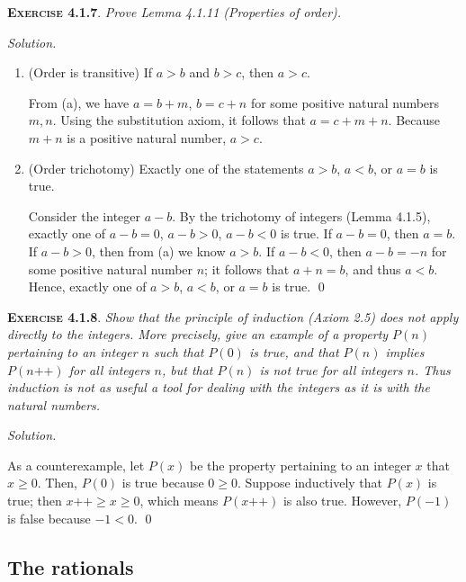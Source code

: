 \documentclass[12pt]{article}
\newcommand{\succr}[1]{#1 \textrm{++}}
\theoremstyle{remark}
\newenvironment{exer}[2]{
    \noindent \setlength{\parskip}{1em}%
    \textsc{\textbf{Exercise #1}}. \textit{#2} \par
    \noindent \textit{Solution.} %
}{\bigskip}
\begin{document}
\begin{exer}{4.1.7}{
    Prove Lemma 4.1.11 (Properties of order).
}
\begin{enumerate}[topsep=0mm,label=(\alph*)]
            To show $-a < -b$, we need to show $(-b) - (-a) > 0$.
            The left-hand side simplifies to $(-b) - (-a) = -b + a = a - b$.
            However, from (a), if $a > b$, then $a - b$ is positive.
            
        \item (Order is transitive) If $a > b$ and $b > c$, then $a > c$.

            From (a), we have $a = b + m$, $b = c + n$ for some positive natural numbers $m, n$.
            Using the substitution axiom, it follows that $a = c + m + n$.
            Because $m + n$ is a positive natural number, $a > c$.
            
        \item (Order trichotomy) Exactly one of the statements $a > b$, $a < b$, or $a = b$ is true.

            Consider the integer $a - b$.
            By the trichotomy of integers (Lemma 4.1.5), exactly one of $a - b = 0$, $a - b > 0$, $a - b < 0$ is true.
            If $a - b = 0$, then $a = b$.
            If $a - b > 0$, then from (a) we know $a > b$.
            If $a - b < 0$, then $a - b = -n$ for some positive natural number $n$; it follows that $a + n = b$, and thus $a < b$.
            Hence, exactly one of $a > b$, $a < b$, or $a = b$ is true. \qed
    \end{enumerate}
\end{exer}


\begin{exer}{4.1.8}{
    Show that the principle of induction (Axiom 2.5) does not apply directly to the integers. 
    More precisely, give an example of a property $P(n)$ pertaining to an integer $n$ such that $P(0)$ is true, and that $P(n)$ implies $P(\succr{n})$ for all integers $n$, but that $P(n)$ is not true for all integers $n$.
    Thus induction is not as useful a tool for dealing with the integers as it is with the natural numbers.
}
    As a counterexample, let $P(x)$ be the property pertaining to an integer $x$ that $x \ge 0$.
    Then, $P(0)$ is true because $0 \ge 0$.
    Suppose inductively that $P(x)$ is true; then $\succr{x} \ge x \ge 0$, which means $P(\succr{x})$ is also true.
    However, $P(-1)$ is false because $-1 < 0$. \qed
\end{exer}


\subsection{The rationals}
\end{document}
